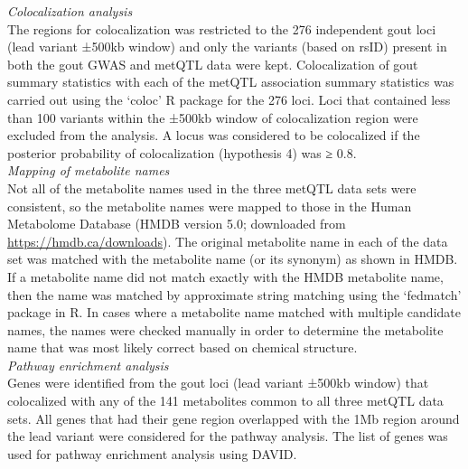 \documentclass[a4paper,10pt]{article}
\begin{document}
\noindent
\textit{Colocalization analysis}\\
The regions for colocalization was restricted to the 276 independent gout loci (lead variant ±500kb window) and only the variants (based on rsID) present in both the gout GWAS and metQTL data were kept.
Colocalization of gout summary statistics with each of the metQTL association summary statistics was carried out using the `coloc'\citep{giambartolomei_bayesian_2014} R\citep{r_core_team_r_2023} package for the 276 loci.
Loci that contained less than 100 variants within the ±500kb window of colocalization region were excluded from the analysis.
A locus was considered to be colocalized if the posterior probability of colocalization (hypothesis 4) was ≥ 0.8.
\\

\noindent
\textit{Mapping of metabolite names}\\
Not all of the metabolite names used in the three metQTL data sets were consistent, so the metabolite names were mapped to those in the Human Metabolome Database\citep{wishart_hmdb_2022} (HMDB version 5.0; downloaded from \url{https://hmdb.ca/downloads}).
The original metabolite name in each of the data set was matched with the metabolite name (or its synonym) as shown in HMDB.
If a metabolite name did not match exactly with the HMDB metabolite name, then the name was matched by approximate string matching using the `fedmatch'\citep{cohen_us_2021} package in R.
In cases where a metabolite name matched with multiple candidate names, the names were checked manually in order to determine the metabolite name that was most likely correct based on chemical structure.
\\

\noindent
\textit{Pathway enrichment analysis}\\
Genes were identified from the gout loci (lead variant ±500kb window) that colocalized with any of the 141 metabolites common to all three metQTL data sets.
All genes that had their gene region overlapped with the 1Mb region around the lead variant were considered for the pathway analysis.
The list of genes was used for pathway enrichment analysis using DAVID\citep{huang_systematic_2009,huang_bioinformatics_2009}.
\\
\end{document}
